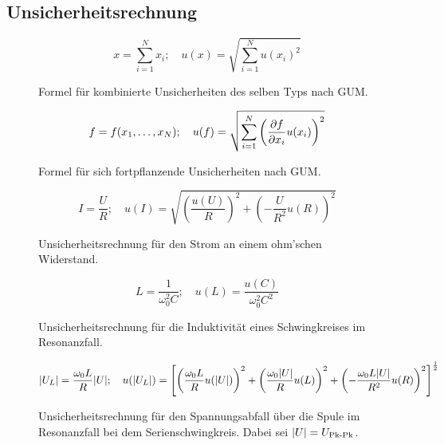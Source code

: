 \subsection{Unsicherheitsrechnung}\label{VGuD}

\begin{figure}[h]
	\begin{equation*}
		x = \sum_{i=1}^{N} x_i
		;\quad
		u(x) = \sqrt{\sum_{i = 1}^{N} u(x_i)^2}
	\end{equation*}
	\caption{Formel für kombinierte Unsicherheiten des selben Typs nach GUM.}
	\label{eq:GUM_combine}
\end{figure}

\begin{figure}[h]
	\begin{equation*}
		f = f(x_1, \dots , x_N)
		;\quad
		u(f) = \sqrt{\sum_{i = 1}^{N}\left(\pdv{f}{x_i} u(x_i)\right) ^2}
	\end{equation*}
	\caption{Formel für sich fortpflanzende Unsicherheiten nach GUM.}
	\label{eq:GUM_formula}
\end{figure}

\begin{figure}[h]
\begin{equation*}
I = \frac{U}{R}
;\quad
u(I) = \sqrt{\left( \frac{u(U)}{R} \right) ^2 + \left( -\frac{U}{R^2} u(R) \right) ^2}
\end{equation*}
\caption{Unsicherheitsrechnung für den Strom an einem ohm'schen Widerstand.}
\label{eq:R=U/I}
\end{figure}

\begin{figure}[h]
\begin{equation*}
L = \frac{1}{\omega_0^2 C}
;\quad
u(L) = \frac{u(C)}{\omega_0^2 C^2}
\end{equation*}
\caption{Unsicherheitsrechnung für die Induktivität eines Schwingkreises im Resonanzfall.}
\label{eq:L=1/w^2C}
\end{figure}

\begin{figure}[h]
\begin{equation*}
\abs{U_L} = \frac{\omega_0 L}{R} \abs{U}
;\quad
u(\abs{U_L}) = \left[ \left( \frac{\omega_0 L}{R} u(\abs{U}) \right) ^2+\left( \frac{\omega_0 \abs{U}}{R} u(L) \right) ^2+\left( -\frac{\omega_0 L \abs{U}}{R^2} u(R) \right) ^2 \right] ^{\frac{1}{2}}
\end{equation*}
\caption{Unsicherheitsrechnung für den Spannungsabfall über die Spule im Resonanzfall bei dem Serienschwingkreis. Dabei sei $\abs{U} = U_\text{Pk-Pk}$.}
\label{eq:U_L=wLU/R}
\end{figure}

